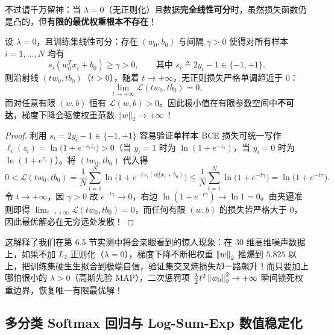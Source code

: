 不过请千万留神：当 $\lambda = 0$（无正则化）且数据\textbf{完全线性可分}时，虽然损失函数仍是凸的，但\textbf{有限的最优权重根本不存在}！

\begin{thmBox}
\begin{proposition}[线性可分数据上无正则逻辑回归的权重发散定理]
\label{prop:ch6-weight-diverge}
设 $\lambda = 0$，且训练集线性可分：存在 $(w_0, b_0)$ 与间隔 $\gamma > 0$ 使得对所有样本 $i = 1, \dots, N$ 均有
\[
  s_i (w_0^T x_i + b_0) \ge \gamma > 0, \qquad \text{其中 } s_i \triangleq 2y_i - 1 \in \{-1, +1\}.
\]
则沿射线 $(t w_0, t b_0)$（$t > 0$），随着 $t \to +\infty$，无正则损失严格单调趋近于 $0$：
\[
  \lim_{t \to +\infty} \mathcal{L}(t w_0, t b_0) = 0,
\]
而对任意有限 $(w, b)$ 恒有 $\mathcal{L}(w, b) > 0$。因此极小值在有限参数空间中\textbf{不可达}，梯度下降会驱使权重范数 $\left\|w\right\|_2 \to +\infty$！
\end{proposition}
\end{thmBox}

\begin{proof}
利用 $s_i = 2y_i - 1 \in \{-1, +1\}$ 容易验证单样本 BCE 损失可统一写作 $\ell_i(z_i) = \ln\!\big(1 + e^{-s_i z_i}\big) > 0$（当 $y_i=1$ 时为 $\ln(1+e^{-z_i})$，当 $y_i=0$ 时为 $\ln(1+e^{z_i})$）。将 $(tw_0, tb_0)$ 代入得
\[
  0 < \mathcal{L}(t w_0, t b_0)
  = \frac{1}{N}\sum_{i=1}^N \ln\!\Big(1 + e^{-t\,s_i(w_0^T x_i + b_0)}\Big)
  \le \frac{1}{N}\sum_{i=1}^N \ln\!\big(1 + e^{-t\gamma}\big)
  = \ln\!\big(1 + e^{-t\gamma}\big).
\]
令 $t \to +\infty$，因 $\gamma > 0$ 故 $e^{-t\gamma} \to 0$，右边 $\ln(1 + e^{-t\gamma}) \to \ln 1 = 0$。由夹逼准则即得 $\lim_{t\to+\infty}\mathcal{L}(t w_0, t b_0) = 0$，而任何有限 $(w, b)$ 的损失皆严格大于 $0$，因此最优解必在无穷远处发散！
\end{proof}

这解释了我们在第 6.5 节实测中将会亲眼看到的惊人现象：在 30 维高维噪声数据上，如果不加 $L_2$ 正则化（$\lambda = 0$），梯度下降不断把权重 $\left\|w\right\|_2$ 推爆到 $5.825$ 以上，把训练集硬生生拟合到极端自信，验证集交叉熵损失却一路飙升！而只要加上哪怕很小的 $\lambda > 0$（高斯先验 MAP），二次惩罚项 $\frac{\lambda}{2}t^2\left\|w_0\right\|_2^2 \to +\infty$ 瞬间锁死权重边界，恢复唯一有限最优解！

\subsection{多分类 Softmax 回归与 Log-Sum-Exp 数值稳定化}
\label{subsec:ch6-softmax-lse}


